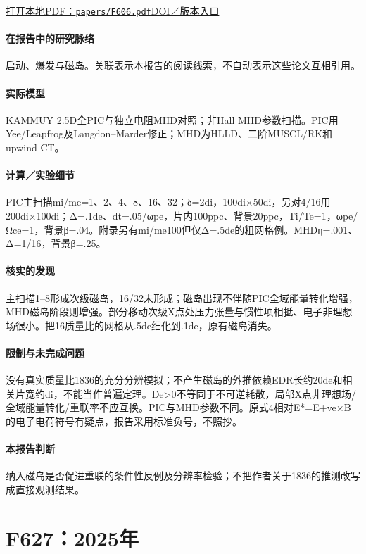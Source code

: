 \documentclass[UTF8,a4paper,11pt,openany,fontset=fandol]{ctexbook}
\begin{document}
\href{run:../papers/F606.pdf}{打开本地PDF：\texttt{papers/F606.pdf}}\quad\href{https://doi.org/10.1063/5.0274477}{DOI／版本入口}

\paragraph{在报告中的研究脉络}\hyperref[story:onset]{启动、爆发与磁岛}。关联表示本报告的阅读线索，不自动表示这些论文互相引用。

\paragraph{实际模型}KAMMUY 2.5D全PIC与独立电阻MHD对照；非Hall MHD参数扫描。PIC用Yee/Leapfrog及Langdon–Marder修正；MHD为HLLD、二阶MUSCL/RK和upwind CT。

\paragraph{计算／实验细节}PIC主扫描mi/me=1、2、4、8、16、32；δ=2di，100di×50di，另对4/16用200di×100di；Δ=.1de、dt=.05/ωpe，片内100ppc、背景20ppc，Ti/Te=1，ωpe/Ωce=1，背景β=.04。附录另有mi/me100但仅Δ=.5de的粗网格例。MHDη=.001、Δ=1/16，背景β=.25。

\paragraph{核实的发现}主扫描1–8形成次级磁岛，16/32未形成；磁岛出现不伴随PIC全域能量转化增强，MHD磁岛阶段则增强。部分移动次级X点处压力张量与惯性项相抵、电子非理想场很小。把16质量比的网格从.5de细化到.1de，原有磁岛消失。

\paragraph{限制与未完成问题}没有真实质量比1836的充分分辨模拟；不产生磁岛的外推依赖EDR长约20de和相关片宽约di，不能当作普遍定理。De>0不等同于不可逆耗散，局部X点非理想场/全域能量转化/重联率不应互换。PIC与MHD参数不同。原式4相对E*=E+ve×B的电子电荷符号有疑点，报告采用标准负号，不照抄。

\paragraph{本报告判断}纳入磁岛是否促进重联的条件性反例及分辨率检验；不把作者关于1836的推测改写成直接观测结果。

\section{F627：2025年}\label{paper:F627}
\end{document}
